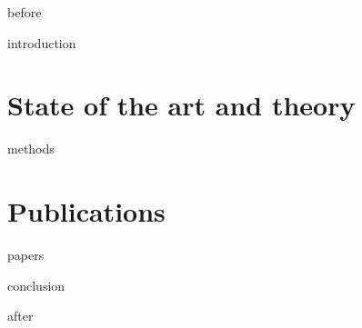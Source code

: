 \documentclass[
	12pt,
	openright,               %
	twoside,                 %
	a4paper,
	french,                  %
	ngerman,                 %
	spanish,                 %
	brazil,                  %
	english,                 %
]{abntex2}
\begin{document}
{before}

\textual{}  %

{introduction}

\part{State of the art and theory}%
\label{part:art-theory}

{methods}

\part{Publications}%
\label{part:publications}

{papers}


{conclusion}

\postextual{}  %

\printbibliography
{after}
\end{document}
